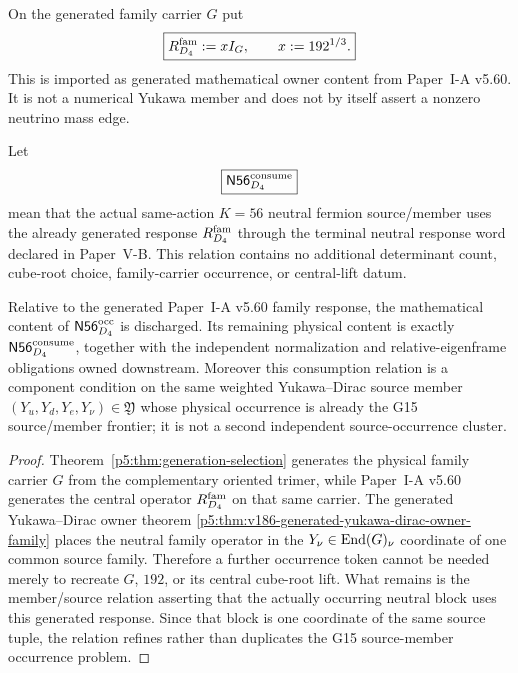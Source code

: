 \documentclass[11pt,a4paper]{article}
\begin{document}
\begin{definition}
\label{p5:def:v374-generated-d4-family-response}
On the generated family carrier \(G\) put
\[
 \boxed{R_{D_4}^{\rm fam}:=xI_G,\qquad x:=192^{1/3}.}
\]
This is imported as generated mathematical owner content from Paper~I-A
v5.60.  It is not a numerical Yukawa member and does not by itself assert a
nonzero neutrino mass edge.
\end{definition}

\begin{definition}
\label{p5:def:v374-n56-source-consumption}
Let
\[
 \boxed{\mathsf{N56}_{D_4}^{\rm consume}}
\]
mean that the actual same-action \(K=56\) neutral fermion source/member uses
the already generated response \(R_{D_4}^{\rm fam}\) through the terminal
neutral response word declared in Paper~V-B.  This relation contains no
additional determinant count, cube-root choice, family-carrier occurrence, or
central-lift datum.
\end{definition}

\begin{proposition}
\label{p5:prop:v374-n56-gate-contraction}
Relative to the generated Paper~I-A v5.60 family response, the mathematical
content of \(\mathsf{N56}_{D_4}^{\rm occ}\) is discharged.  Its remaining
physical content is exactly
\(\mathsf{N56}_{D_4}^{\rm consume}\), together with the independent
normalization and relative-eigenframe obligations owned downstream.
Moreover this consumption relation is a component condition on the same
weighted Yukawa--Dirac source member
\((Y_u,Y_d,Y_e,Y_\nu)\in\mathfrak Y\) whose physical occurrence is already the
G15 source/member frontier; it is not a second independent source-occurrence
cluster.
\end{proposition}

\begin{proof}
Theorem~\ref{p5:thm:generation-selection} generates the physical family
carrier \(G\) from the complementary oriented trimer, while Paper~I-A v5.60
generates the central operator \(R_{D_4}^{\rm fam}\) on that same carrier.
The generated Yukawa--Dirac owner theorem
\ref{p5:thm:v186-generated-yukawa-dirac-owner-family} places the neutral
family operator in the \(Y_\nu\in\operatorname{End}(G)_\nu\) coordinate of one common source
family.  Therefore a further occurrence token cannot be needed merely to
recreate \(G\), \(192\), or its central cube-root lift.  What remains is the
member/source relation asserting that the actually occurring neutral block
uses this generated response.  Since that block is one coordinate of the
same source tuple, the relation refines rather than duplicates the G15
source-member occurrence problem.
\end{proof}
\end{document}
